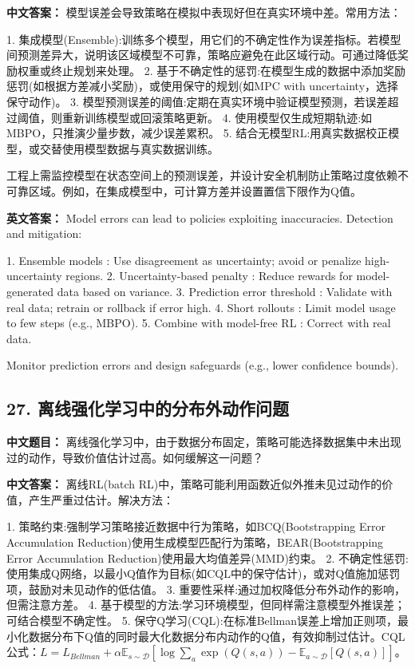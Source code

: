 \documentclass[10pt,a4paper]{ctexart}
\begin{document}
\textbf{中文答案：}  
模型误差会导致策略在模拟中表现好但在真实环境中差。常用方法：

1.  集成模型(Ensemble):训练多个模型，用它们的不确定性作为误差指标。若模型间预测差异大，说明该区域模型不可靠，策略应避免在此区域行动。可通过降低奖励权重或终止规划来处理。
2.  基于不确定性的惩罚:在模型生成的数据中添加奖励惩罚(如根据方差减小奖励)，或使用保守的规划(如MPC with uncertainty，选择保守动作)。
3.  模型预测误差的阈值:定期在真实环境中验证模型预测，若误差超过阈值，则重新训练模型或回滚策略更新。
4.  使用模型仅生成短期轨迹:如MBPO，只推演少量步数，减少误差累积。
5.  结合无模型RL:用真实数据校正模型，或交替使用模型数据与真实数据训练。

工程上需监控模型在状态空间上的预测误差，并设计安全机制防止策略过度依赖不可靠区域。例如，在集成模型中，可计算方差并设置置信下限作为Q值。

\textbf{英文答案：}  
Model errors can lead to policies exploiting inaccuracies. Detection and mitigation:

1.  Ensemble models : Use disagreement as uncertainty; avoid or penalize high-uncertainty regions.
2.  Uncertainty-based penalty : Reduce rewards for model-generated data based on variance.
3.  Prediction error threshold : Validate with real data; retrain or rollback if error high.
4.  Short rollouts : Limit model usage to few steps (e.g., MBPO).
5.  Combine with model-free RL : Correct with real data.

Monitor prediction errors and design safeguards (e.g., lower confidence bounds).

\subsection*{27. 离线强化学习中的分布外动作问题}
\textbf{中文题目：} 离线强化学习中，由于数据分布固定，策略可能选择数据集中未出现过的动作，导致价值估计过高。如何缓解这一问题？

\textbf{中文答案：}  
离线RL(batch RL)中，策略可能利用函数近似外推未见过动作的价值，产生严重过估计。解决方法：

1.  策略约束:强制学习策略接近数据中行为策略，如BCQ(Bootstrapping Error Accumulation Reduction)使用生成模型匹配行为策略，BEAR(Bootstrapping Error Accumulation Reduction)使用最大均值差异(MMD)约束。
2.  不确定性惩罚:使用集成Q网络，以最小Q值作为目标(如CQL中的保守估计)，或对Q值施加惩罚项，鼓励对未见动作的低估值。
3.  重要性采样:通过加权降低分布外动作的影响，但需注意方差。
4.  基于模型的方法:学习环境模型，但同样需注意模型外推误差；可结合模型不确定性。
5.  保守Q学习(CQL):在标准Bellman误差上增加正则项，最小化数据分布下Q值的同时最大化数据分布内动作的Q值，有效抑制过估计。CQL公式：\(L = L_{Bellman} + \alpha \mathbb{E}_{s \sim \mathcal{D}}[\log \sum_a \exp(Q(s,a)) - \mathbb{E}_{a \sim \mathcal{D}}[Q(s,a)]]\)。
\end{document}
